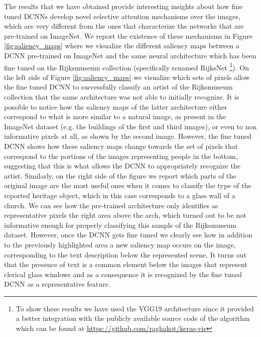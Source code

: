\documentclass[runningheads]{llncs}
\begin{document}
The results that we have obtained provide interesting insights about how fine tuned DCNNs develop novel selective attention mechanisms over the images, which are very different from the ones that characterize the networks that are pre-trained on ImageNet. We report the existence of these mechanisms in Figure \ref{fig:saliency_maps} where we visualize the different saliency maps between a DCNN pre-trained on ImageNet and the same neural architecture which has been fine tuned on the Rijksmuseum collection (specifically renamed RijksNet \footnote{To show these results we have used the VGG19 architecture since it provided a better integration with the publicly available source code of the algorithm which can be found at \url{https://github.com/raghakot/keras-vis}}). On the left side of Figure \ref{fig:saliency_maps} we visualize which sets of pixels allow the fine tuned DCNN to successfully classify an artist of the Rijksmuseum collection that the same architecture was not able to initially recognize. It is possible to notice how the saliency maps of the latter architecture either correspond to what is more similar to a natural image, as present in the ImageNet dataset (e.g. the buildings of the first and third images), or even to non informative pixels at all, as shown by the second image. However, the fine tuned DCNN shows how these saliency maps change towards the set of pixels that correspond to the portions of the images representing people in the bottom, suggesting that this is what allows the DCNN to appropriately recognize the artist. Similarly, on the right side of the figure we report which parts of the original image are the most useful ones when it comes to classify the type of the reported heritage object, which in this case corresponds to a glass wall of a church. We can see how the pre-trained architecture only identifies as representative pixels the right area above the arch, which turned out to be not informative enough for properly classifying this sample of the Rijksmuseum dataset. However, once the DCNN gets fine tuned we clearly see how in addition to the previously highlighted area a new saliency map occurs on the image, corresponding to the text description below the represented scene. It turns out that the presence of text is a common element below the images that represent clerical glass windows and as a consequence it is recognized by the fine tuned DCNN as a representative feature.
\end{document}
